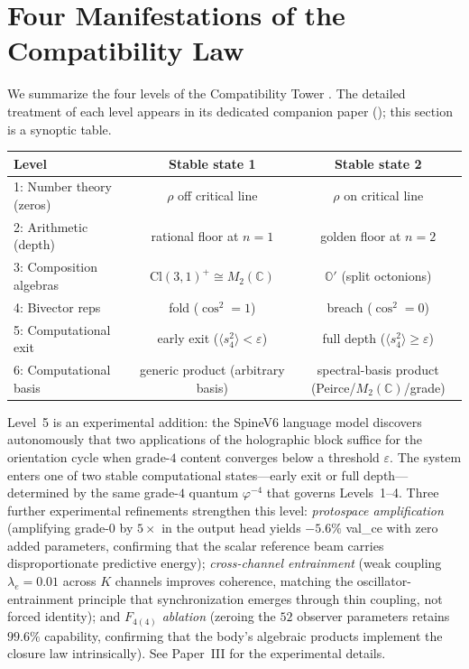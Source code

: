 \documentclass[11pt,a4paper]{article}
\theoremstyle{plain}
\theoremstyle{definition}
\theoremstyle{remark}
\numberwithin{equation}{section}
\providecommand{\Cl}{\mathrm{Cl}}
\providecommand{\C}{\mathbb{C}}
\providecommand{\Os}{\mathbb{O}'}
\providecommand{\vp}{\varphi}
\begin{document}
\section{Four Manifestations of the Compatibility Law}
\label{sec:four-levels}

We summarize the four levels of the Compatibility Tower
\cite{compatibility-tower}.  The detailed treatment of each level
appears in its dedicated companion paper
(\cite{echo-rh,two-floor,cd-lift,fold-breach}); this section is a
synoptic table.

\begin{center}
\renewcommand{\arraystretch}{1.2}
\begin{tabular}{l c c}
\toprule
\textbf{Level} & \textbf{Stable state 1} & \textbf{Stable state 2} \\
\midrule
1: Number theory (zeros) & $\rho$ off critical line   & $\rho$ on critical line \\
2: Arithmetic (depth)    & rational floor at $n=1$    & golden floor at $n=2$ \\
3: Composition algebras  & $\Cl(3,1)^+ \cong M_2(\C)$ & $\Os$ (split octonions)\\
4: Bivector reps         & fold ($\cos^2 = 1$)        & breach ($\cos^2 = 0$) \\
5: Computational exit    & early exit ($\langle s_4^2\rangle < \varepsilon$) & full depth ($\langle s_4^2\rangle \ge \varepsilon$) \\
6: Computational basis   & generic product (arbitrary basis)  & spectral-basis product (Peirce/$M_2(\C)$/grade) \\
\bottomrule
\end{tabular}
\end{center}

\noindent
Level~5 is an experimental addition: the SpineV6 language model
\cite{spine-v6} discovers autonomously that two applications of
the holographic block suffice for the orientation cycle when
grade-$4$ content converges below a threshold $\varepsilon$.
The system enters one of two stable computational states---early
exit or full depth---determined by the same grade-$4$ quantum
$\vp^{-4}$ that governs Levels~1--4.  Three further experimental
refinements strengthen this level:
\emph{protospace amplification} (amplifying grade-$0$ by $5\times$
in the output head yields $-5.6\%$ val\_ce with zero added
parameters, confirming that the scalar reference beam carries
disproportionate predictive energy);
\emph{cross-channel entrainment} (weak coupling $\lambda_e =
0.01$ across $K$ channels improves coherence, matching the
oscillator-entrainment principle that synchronization emerges
through thin coupling, not forced identity);
and \emph{$F_{4(4)}$ ablation} (zeroing the $52$ observer
parameters retains $99.6\%$ capability, confirming that the
body's algebraic products implement the closure law
intrinsically).  See Paper~III \cite[\S 12]{paper-III-monad}
for the experimental details.
\end{document}
